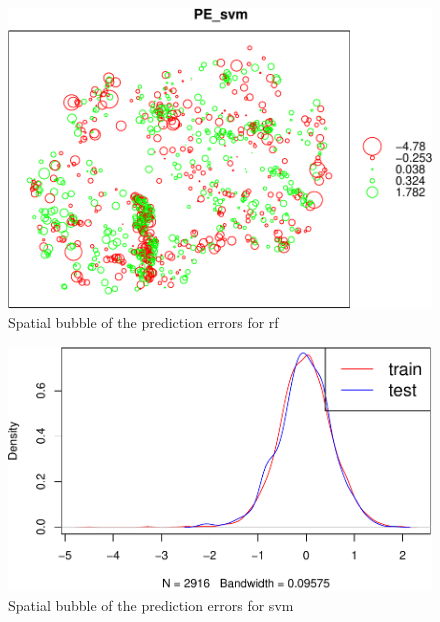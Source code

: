 \documentclass[10pt,b5paper,]{book}
\newenvironment{Shaded}{\begin{snugshade}}{\end{snugshade}}
\newcommand{\CommentTok}[1]{\textcolor[rgb]{0.56,0.35,0.01}{\textit{#1}}}
\newcommand{\DataTypeTok}[1]{\textcolor[rgb]{0.13,0.29,0.53}{#1}}
\newcommand{\DecValTok}[1]{\textcolor[rgb]{0.00,0.00,0.81}{#1}}
\newcommand{\KeywordTok}[1]{\textcolor[rgb]{0.13,0.29,0.53}{\textbf{#1}}}
\newcommand{\NormalTok}[1]{#1}
\newcommand{\OperatorTok}[1]{\textcolor[rgb]{0.81,0.36,0.00}{\textbf{#1}}}
\newcommand{\StringTok}[1]{\textcolor[rgb]{0.31,0.60,0.02}{#1}}
\theoremstyle{definition}
\theoremstyle{definition}
\theoremstyle{definition}
\theoremstyle{remark}
\begin{document}
\begin{figure}
\centering
\includegraphics{SOCMapping_files/figure-latex/unnamed-chunk-90-1.pdf}
\caption{\label{fig:unnamed-chunk-90}Spatial bubble of the prediction errors
for rf}
\end{figure}

\begin{Shaded}
\end{Shaded}

\begin{figure}
\centering
\includegraphics{SOCMapping_files/figure-latex/unnamed-chunk-91-1.pdf}
\caption{\label{fig:unnamed-chunk-91}Spatial bubble of the prediction errors
for svm}
\end{figure}
\end{document}
